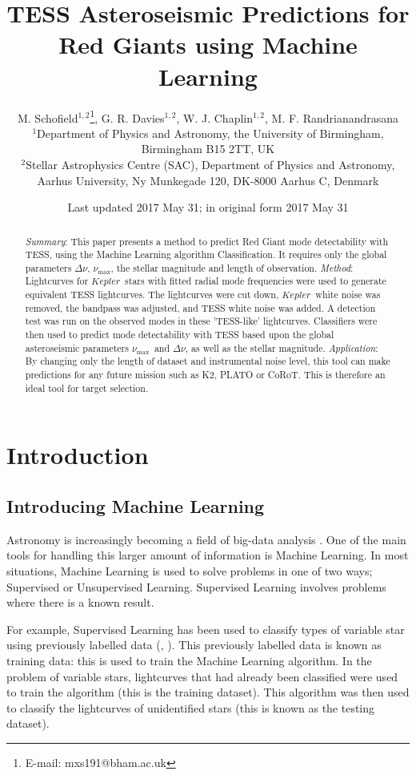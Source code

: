 \documentclass[a4paper,fleqn,usenatbib,useAMS]{mnras}
\title[TRG]{TESS Asteroseismic Predictions for Red Giants using Machine Learning}
\author[M. Schofield et al.]{M. Schofield$^{1, 2}$\thanks{E-mail: mxs191@bham.ac.uk}, G. R. Davies$^{1, 2}$, W. J. Chaplin$^{1, 2}$, M. F. Randrianandrasana
\\
$^{1}$Department of Physics and Astronomy, the University of Birmingham, Birmingham B15 2TT, UK \\
$^{2}$Stellar Astrophysics Centre (SAC), Department of Physics and Astronomy, Aarhus University, Ny Munkegade 120, DK-8000 Aarhus C, Denmark}
\date{Last updated 2017 May 31; in original form 2017 May 31}
\newcommand{\numax}{\ensuremath{\nu_{\textrm{max}}}}
\newcommand{\dnu}{\ensuremath{\Delta\nu}}
\newcommand{\kep}{\ensuremath{Kepler}}
\begin{document}
\label{firstpage}
\pagerange{\pageref{firstpage}--\pageref{lastpage}}
\maketitle

\begin{abstract}
{\it Summary}: This paper presents a method to predict Red Giant mode detectability with TESS, using the Machine Learning algorithm Classification. It requires only the global parameters \dnu, \numax, the stellar magnitude and length of observation. \newline
{\it Method}: Lightcurves for \kep \ stars with fitted radial mode frequencies were used to generate equivalent TESS lightcurves. The lightcurves were cut down, \kep \ white noise was removed, the bandpass was adjusted, and TESS white noise was added. A detection test was run on the observed modes in these 'TESS-like' lightcurves. Classifiers were then used to predict mode detectability with TESS based upon the global asteroseismic parameters \numax \ and \dnu, as well as the stellar magnitude.\newline
{\it Application}: By changing only the length of dataset and instrumental noise level, this tool can make predictions for any future mission such as K2, PLATO or CoRoT. This is therefore an ideal tool for target selection.
\end{abstract}


\section{Introduction}

\subsection{Introducing Machine Learning}

Astronomy is increasingly becoming a field of big-data analysis \citep{kremer_big_2017}. One of the main tools for handling this larger amount of information is Machine Learning. In most situations, Machine Learning is used to solve problems in one of two ways; Supervised or Unsupervised Learning. Supervised Learning involves problems where there is a known result. 

For example, Supervised Learning has been used to classify types of variable star using previously labelled data (\citet{nun_supervised_2014}, \citet{elorrieta_machine_2016}). This previously labelled data is known as training data: this is used to train the Machine Learning algorithm. In the problem of variable stars, lightcurves that had already been classified were used to train the algorithm (this is the training dataset). This algorithm was then used to classify the lightcurves of unidentified stars (this is known as the testing dataset).
\end{document}
